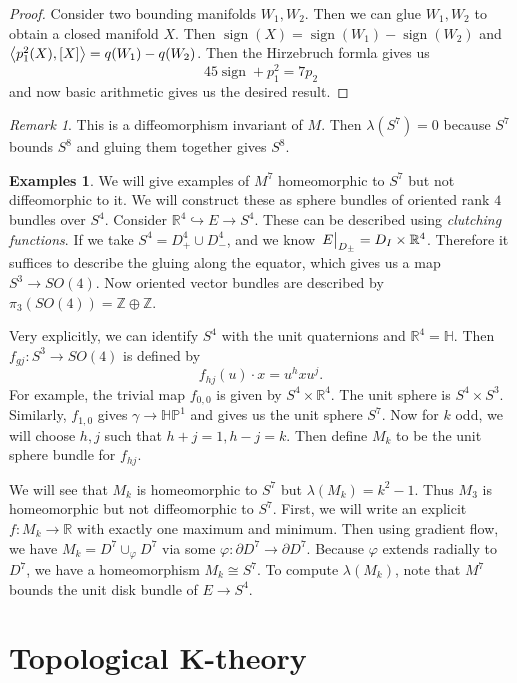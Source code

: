 \documentclass[leqno, openany]{memoir}
\theoremstyle{definition}
\newtheorem{exms}[thm]{Examples}
\theoremstyle{remark}
\newtheorem{rmk}[thm]{Remark}
\theoremstyle{plain}
\theoremstyle{definition}
\theoremstyle{remark}
\newcommand{\R}{\mathbb{R}}
\renewcommand{\H}{\mathbb{H}}
\newcommand{\Z}{\mathbb{Z}}
\renewcommand{\P}{\mathbb{P}}
\DeclareMathOperator{\sign}{sign}
\begin{document}
\begin{proof}
    Consider two bounding manifolds $W_1, W_2$. Then we can glue $W_1, W_2$ to obtain a closed manifold $X$. Then $\sign(X) = \sign(W_1) - \sign(W_2)$ and $\ev{p_1^2(X), [X]} = q(W_1) - q(W_2)$. Then the Hirzebruch formla gives us
    \[ 45 \sign + p_1^2 = 7 p_2 \]
    and now basic arithmetic gives us the desired result.
\end{proof}

\begin{rmk}
    This is a diffeomorphism invariant of $M$. Then $\lambda(S^7) = 0$ because $S^7$ bounds $S^8$ and gluing them together gives $S^8$.
\end{rmk}

\begin{exms}
    We will give examples of $M^7$ homeomorphic to $S^7$ but not diffeomorphic to it. We will construct these as sphere bundles of oriented rank $4$ bundles over $S^4$. Consider $\R^4 \hookrightarrow E \to S^4$. These can be described using \textit{clutching functions}. If we take $S^4 = D_+^4 \cup D_-^4$, and we know $\eval{E}_{D_{\pm}} = D_I \times \R^4$. Therefore it suffices to describe the gluing along the equator, which gives us a map $S^3 \to SO(4)$. Now oriented vector bundles are described by $\pi_3(SO(4)) = \Z \oplus \Z$. 

    Very explicitly, we can identify $S^4$ with the unit quaternions and $\R^4 = \H$. Then $f_{gj} \colon S^3 \to SO(4)$ is defined by
    \[ f_{hj}(u) \cdot x = u^h x u^j. \]
    For example, the trivial map $f_{0,0}$ is given by $S^4 \times \R^4$. The unit sphere is $S^4 \times S^3$. Similarly, $f_{1,0}$ gives $\gamma \to \H\P^1$ and gives us the unit sphere $S^7$. Now for $k$ odd, we will choose $h,j$ such that $h+j=1, h-j=k$. Then define $M_k$ to be the unit sphere bundle for $f_{hj}$.

    We will see that $M_k$ is homeomorphic to $S^7$ but $\lambda(M_k) = k^2-1$. Thus $M_3$ is homeomorphic but not diffeomorphic to $S^7$. First, we will write an explicit $f \colon M_k \to \R$ with exactly one maximum and minimum. Then using gradient flow, we have $M_k = D^7 \cup_{\varphi} D^7$ via some $\varphi \colon \partial D^7 \to \partial D^7$. Because $\varphi$ extends radially to $D^7$, we have a homeomorphism $M_k \cong S^7$. To compute $\lambda(M_k)$, note that $M^7$ bounds the unit disk bundle of $E \to S^4$.
\end{exms}

\section{Topological K-theory}%
\label{sec:topological_k_theory}
\end{document}
